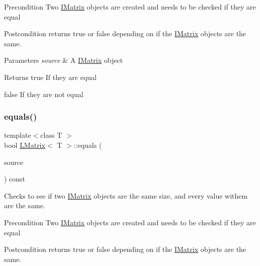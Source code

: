 \begin{DoxyPrecond}{Precondition}
Two \mbox{\hyperlink{class_i_matrix}{I\+Matrix}} objects are created and needs to be checked if they are equal 
\end{DoxyPrecond}
\begin{DoxyPostcond}{Postcondition}
returns true or false depending on if the \mbox{\hyperlink{class_i_matrix}{I\+Matrix}} objects are the same.
\end{DoxyPostcond}

\begin{DoxyParams}{Parameters}
{\em source} & A \mbox{\hyperlink{class_i_matrix}{I\+Matrix}} object \\
\hline
\end{DoxyParams}
\begin{DoxyReturn}{Returns}
true If they are equal 

false If they are not equal 
\end{DoxyReturn}
\mbox{\label{class_l_matrix_ae7c915ab41167123252a6a4a29c429b8}} 
\subsubsection{\texorpdfstring{equals()}{equals()}\hspace{0.1cm}{\footnotesize\ttfamily [5/6]}}
{\footnotesize\ttfamily template$<$class T $>$ \\
bool \mbox{\hyperlink{class_l_matrix}{L\+Matrix}}$<$ T $>$\+::equals (\begin{DoxyParamCaption}\item[{const \mbox{\hyperlink{class_i_matrix}{I\+Matrix}}$<$ \mbox{\hyperlink{class_s_matrix}{S\+Matrix}}$<$ T $>$, T $>$ \&}]{source }\end{DoxyParamCaption}) const}



Checks to see if two \mbox{\hyperlink{class_i_matrix}{I\+Matrix}} objects are the same size, and every value withem are the same. 

\begin{DoxyPrecond}{Precondition}
Two \mbox{\hyperlink{class_i_matrix}{I\+Matrix}} objects are created and needs to be checked if they are equal 
\end{DoxyPrecond}
\begin{DoxyPostcond}{Postcondition}
returns true or false depending on if the \mbox{\hyperlink{class_i_matrix}{I\+Matrix}} objects are the same.
\end{DoxyPostcond}


